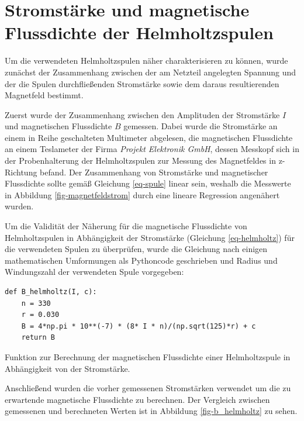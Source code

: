 \documentclass[page,pdftex,12pt,a4paper,twoside,openright]{scrbook}
\begin{document}
\section{Stromstärke und magnetische Flussdichte der Helmholtzspulen \label{sec-b_helmholtz}}
\label{sec:org5798576}
Um die verwendeten Helmholtzspulen näher charakterisieren zu können, wurde zunächst der Zusammenhang zwischen der am Netzteil angelegten Spannung und der die Spulen durchfließenden Stromstärke sowie dem daraus resultierenden Magnetfeld bestimmt.

Zuerst wurde der Zusammenhang zwischen den Amplituden der Stromstärke \(I\) und magnetischen Flussdichte \(B\) gemessen. Dabei wurde die Stromstärke an einem in Reihe geschalteten Multimeter abgelesen, die magnetischen Flussdichte an einem Teslameter der Firma \emph{Projekt Elektronik GmbH}, dessen Messkopf sich in der Probenhalterung der Helmholtzspulen zur Messung des Magnetfeldes in z-Richtung befand. Der Zusammenhang von Stromstärke und magnetischer Flussdichte sollte gemäß Gleichung \ref{eq-spule} linear sein, weshalb die Messwerte in Abbildung \ref{fig-magnetfeldstrom} durch eine lineare Regression angenähert wurden.

Um die Validität der Näherung für die magnetische Flussdichte von Helmholtzspulen in Abhängigkeit der Stromstärke (Gleichung \ref{eq-helmholtz}) für die verwendeten Spulen zu überprüfen, wurde die Gleichung nach einigen mathematischen Umformungen als Pythoncode geschrieben und Radius und Windungszahl der verwendeten Spule vorgegeben:

\begin{listing}[htbp]
\begin{verbatim}
def B_helmholtz(I, c):
    n = 330
    r = 0.030
    B = 4*np.pi * 10**(-7) * (8* I * n)/(np.sqrt(125)*r) + c
    return B
\end{verbatim}
\caption{Funktion zur Berechnung der magnetischen Flussdichte einer Helmholtzspule in Abhängigkeit von der Stromstärke.}
\end{listing}

Anschließend wurden die vorher gemessenen Stromstärken verwendet um die zu erwartende magnetische Flussdichte zu berechnen. Der Vergleich zwischen gemessenen und berechneten Werten ist in Abbildung \ref{fig-b_helmholtz} zu sehen.
\end{document}
